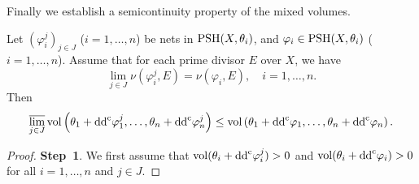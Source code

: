 Finally we establish a semicontinuity property of the mixed volumes.
\begin{theorem}\label{thm:usc_mix_vol}
   Let $(\varphi_i^j)_{j\in J}$ ($i=1,\ldots,n$) be nets in $\mathrm{PSH}(X,\theta_i)$, and $\varphi_i\in \mathrm{PSH}(X,\theta_i)$ ($i=1,\ldots,n$). Assume that for each prime divisor $E$ over $X$, we have
   \[
   \lim_{j\in J} \nu\left(\varphi_i^j,E\right)=\nu\left(\varphi_i,E\right),\quad i=1,\ldots,n.
   \]
   Then
   \[
   \varlimsup_{j\in J} \operatorname{vol} \left(\theta_1+\mathrm{dd}^{\mathrm{c}} \varphi_1^j, \dots,\theta_n+\mathrm{dd}^{\mathrm{c}} \varphi_n^j \right) \leq  \operatorname{vol}\left(\theta_1+\mathrm{dd}^{\mathrm{c}} \varphi_1, \dots,\theta_n+\mathrm{dd}^{\mathrm{c}} \varphi_n\right).
   \]
\end{theorem}
\begin{proof}
    \textbf{Step~1}. We first assume that $\operatorname{vol} (\theta_i+\mathrm{dd}^{\mathrm{c}} \varphi_i^j)>0$ and $\operatorname{vol} (\theta_i+\mathrm{dd}^{\mathrm{c}} \varphi_i)>0$ for all $i=1,\ldots,n$ and $j\in J$.


\end{proof}
